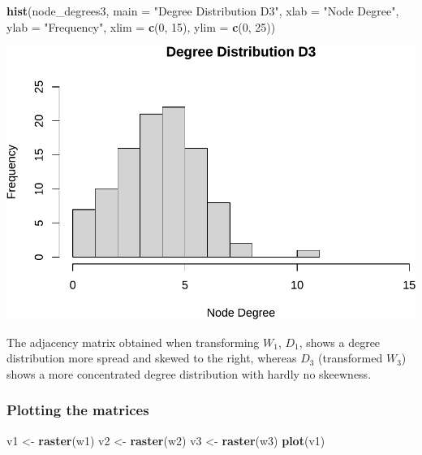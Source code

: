 \documentclass[
  a4paper,
]{article}
\newenvironment{Shaded}{\begin{snugshade}}{\end{snugshade}}
\newcommand{\AttributeTok}[1]{\textcolor[rgb]{0.13,0.29,0.53}{#1}}
\newcommand{\DecValTok}[1]{\textcolor[rgb]{0.00,0.00,0.81}{#1}}
\newcommand{\FunctionTok}[1]{\textcolor[rgb]{0.13,0.29,0.53}{\textbf{#1}}}
\newcommand{\NormalTok}[1]{#1}
\newcommand{\OtherTok}[1]{\textcolor[rgb]{0.56,0.35,0.01}{#1}}
\newcommand{\StringTok}[1]{\textcolor[rgb]{0.31,0.60,0.02}{#1}}
\begin{document}
\begin{Shaded}
\begin{Highlighting}[]
\FunctionTok{hist}\NormalTok{(node\_degrees3, }\AttributeTok{main =} \StringTok{"Degree Distribution D3"}\NormalTok{, }\AttributeTok{xlab =} \StringTok{"Node Degree"}\NormalTok{, }\AttributeTok{ylab =} \StringTok{"Frequency"}\NormalTok{,}
    \AttributeTok{xlim =} \FunctionTok{c}\NormalTok{(}\DecValTok{0}\NormalTok{, }\DecValTok{15}\NormalTok{), }\AttributeTok{ylim =} \FunctionTok{c}\NormalTok{(}\DecValTok{0}\NormalTok{, }\DecValTok{25}\NormalTok{))}
\end{Highlighting}
\end{Shaded}

\includegraphics{assignment2_files/figure-latex/unnamed-chunk-9-2.pdf}

The adjacency matrix obtained when transforming \(W_1\), \(D_1\), shows
a degree distribution more spread and skewed to the right, whereas
\(D_3\) (transformed \(W_3\)) shows a more concentrated degree
distribution with hardly no skeewness.

\subsubsection{Plotting the matrices}\label{plotting-the-matrices}

\begin{Shaded}
\begin{Highlighting}[]
\NormalTok{v1 }\OtherTok{\textless{}{-}} \FunctionTok{raster}\NormalTok{(w1)}
\NormalTok{v2 }\OtherTok{\textless{}{-}} \FunctionTok{raster}\NormalTok{(w2)}
\NormalTok{v3 }\OtherTok{\textless{}{-}} \FunctionTok{raster}\NormalTok{(w3)}
\FunctionTok{plot}\NormalTok{(v1)}
\end{Highlighting}
\end{Shaded}
\end{document}
